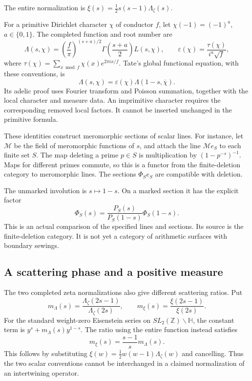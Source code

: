 The entire normalization is $\xi(s)=\tfrac12s(s-1)\Lambda_\zeta(s)$.

For a primitive Dirichlet character $\chi$ of conductor $f$, let
$\chi(-1)=(-1)^a$, $a\in\{0,1\}$. The completed function and root number are
\[
 \Lambda(s,\chi)
   =\left(\frac f\pi\right)^{(s+a)/2}
         \Gamma\left(\frac{s+a}{2}\right)L(s,\chi),
 \qquad
 \varepsilon(\chi)=\frac{\tau(\chi)}{i^a\sqrt f},
\]
where $\tau(\chi)=\sum_{x\bmod f}\chi(x)e^{2\pi ix/f}$. Tate's global
functional equation, with these conventions, is
\[
 \Lambda(s,\chi)
     =\varepsilon(\chi)\Lambda(1-s,\overline\chi).
\]
Its adelic proof uses Fourier transform and Poisson summation, together with
the local character and measure data. An imprimitive character requires the
corresponding removed local factors. It cannot be inserted unchanged in the
primitive formula.

These identities construct meromorphic sections of scalar lines. For
instance, let $\mathcal M$ be the field of meromorphic functions of $s$, and
attach the line $\mathcal M e_S$ to each finite set $S$. The map deleting a
prime $p\in S$ is multiplication by $(1-p^{-s})^{-1}$. Maps for different
primes commute, so this is a functor from the finite-deletion category to
meromorphic lines. The sections $\Phi_S e_S$ are compatible with deletion.

The unmarked involution is $s\mapsto1-s$. On a marked section it has the
explicit factor
\[
 \Phi_S(s)=\frac{P_S(s)}{P_S(1-s)}\Phi_S(1-s).
\]
This is an actual comparison of the specified lines and sections. Its source
is the finite-deletion category. It is not yet a category of arithmetic
surfaces with boundary sewings.

\subsection{A scattering phase and a positive measure}

The two completed zeta normalizations also give different scattering ratios.
Put
\[
 m_\Lambda(s)=\frac{\Lambda_\zeta(2s-1)}{\Lambda_\zeta(2s)},
 \qquad
 m_\xi(s)=\frac{\xi(2s-1)}{\xi(2s)}.
\]
For the standard weight-zero Eisenstein series on $SL_2(\mathbb
Z)\backslash\mathbb H$, the constant term is $y^s+m_\Lambda(s)y^{1-s}$. The
ratio using the entire function instead satisfies
\begin{equation}
\label{v4-arith:traces:scattering-normalizations}
 m_\xi(s)=\frac{s-1}{s}m_\Lambda(s).
\end{equation}
This follows by substituting $\xi(w)=\tfrac12w(w-1)\Lambda_\zeta(w)$ and
cancelling. Thus the two scalar conventions cannot be interchanged in a
claimed normalization of an intertwining operator.

